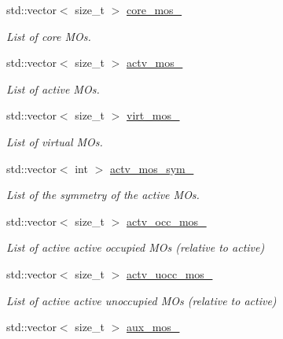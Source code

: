 \begin{DoxyCompactItemize}
std\+::vector$<$ size\+\_\+t $>$ \mbox{\hyperlink{classforte_1_1_m_a_s_t_e_r___d_s_r_g_a2f5d7f7961274d119c19c11a5b39905a}{core\+\_\+mos\+\_\+}}
\begin{DoxyCompactList}\small\item\em List of core M\+Os. \end{DoxyCompactList}\item 
std\+::vector$<$ size\+\_\+t $>$ \mbox{\hyperlink{classforte_1_1_m_a_s_t_e_r___d_s_r_g_a9978e9868d8be83728564dc354b61e98}{actv\+\_\+mos\+\_\+}}
\begin{DoxyCompactList}\small\item\em List of active M\+Os. \end{DoxyCompactList}\item 
std\+::vector$<$ size\+\_\+t $>$ \mbox{\hyperlink{classforte_1_1_m_a_s_t_e_r___d_s_r_g_af8fbd4b67e14757e14efd64522cc7429}{virt\+\_\+mos\+\_\+}}
\begin{DoxyCompactList}\small\item\em List of virtual M\+Os. \end{DoxyCompactList}\item 
std\+::vector$<$ int $>$ \mbox{\hyperlink{classforte_1_1_m_a_s_t_e_r___d_s_r_g_a236887b668d0a9f44e9dd6b42871ecd3}{actv\+\_\+mos\+\_\+sym\+\_\+}}
\begin{DoxyCompactList}\small\item\em List of the symmetry of the active M\+Os. \end{DoxyCompactList}\item 
std\+::vector$<$ size\+\_\+t $>$ \mbox{\hyperlink{classforte_1_1_m_a_s_t_e_r___d_s_r_g_a7432d0fe9aae0de0baf3b892e075d56d}{actv\+\_\+occ\+\_\+mos\+\_\+}}
\begin{DoxyCompactList}\small\item\em List of active active occupied M\+Os (relative to active) \end{DoxyCompactList}\item 
std\+::vector$<$ size\+\_\+t $>$ \mbox{\hyperlink{classforte_1_1_m_a_s_t_e_r___d_s_r_g_acd46f3dbf097ddbb32be2ba174192f9c}{actv\+\_\+uocc\+\_\+mos\+\_\+}}
\begin{DoxyCompactList}\small\item\em List of active active unoccupied M\+Os (relative to active) \end{DoxyCompactList}\item 
std\+::vector$<$ size\+\_\+t $>$ \mbox{\hyperlink{classforte_1_1_m_a_s_t_e_r___d_s_r_g_a0e02a28d8bbc12efe150cae96cb3d212}{aux\+\_\+mos\+\_\+}}

\end{DoxyCompactItemize}
